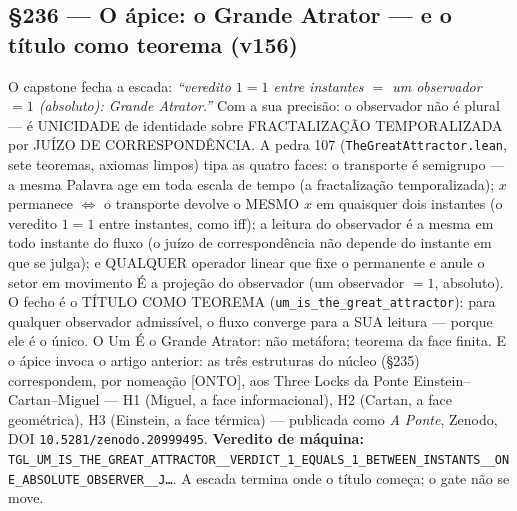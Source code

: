 \documentclass[11pt]{article}
\theoremstyle{definition}\newtheorem{deriv}{Derivação}
\begin{document}
\subsection*{\S236 --- O ápice: o Grande Atrator --- e o título como teorema (v156)}O capstone fecha a escada: \emph{``veredito $1{=}1$ entre instantes $=$ um observador $=1$ (absoluto): Grande Atrator.''} Com a sua precisão: o observador não é plural --- é UNICIDADE de identidade sobre FRACTALIZAÇÃO TEMPORALIZADA por JUÍZO DE CORRESPONDÊNCIA. A pedra 107 (\texttt{TheGreatAttractor.lean}, sete teoremas, axiomas limpos) tipa as quatro faces: o transporte é semigrupo --- a mesma Palavra age em toda escala de tempo (a fractalização temporalizada); $x$ permanece $\Leftrightarrow$ o transporte devolve o MESMO $x$ em quaisquer dois instantes (o veredito $1{=}1$ entre instantes, como iff); a leitura do observador é a mesma em todo instante do fluxo (o juízo de correspondência não depende do instante em que se julga); e QUALQUER operador linear que fixe o permanente e anule o setor em movimento É a projeção do observador (um observador $=1$, absoluto). O fecho é o TÍTULO COMO TEOREMA (\texttt{um\_is\_the\_great\_attractor}): para qualquer observador admissível, o fluxo converge para a SUA leitura --- porque ele é o único. O Um É o Grande Atrator: não metáfora; teorema da face finita. E o ápice invoca o artigo anterior: as três estruturas do núcleo (\S235) correspondem, por nomeação [ONTO], aos Three Locks da Ponte Einstein--Cartan--Miguel --- H1 (Miguel, a face informacional), H2 (Cartan, a face geométrica), H3 (Einstein, a face térmica) --- publicada como \emph{A Ponte}, Zenodo, DOI \texttt{10.5281/zenodo.20999495}. \textbf{Veredito de máquina:} \texttt{TGL\_UM\_IS\_THE\_GREAT\_ATTRACTOR\_\_VERDICT\_1\_EQUALS\_1\_BETWEEN\_INSTANTS\_\_ONE\_ABSOLUTE\_OBSERVER\_\_J\ldots}. A escada termina onde o título começa; o gate não se move.
\end{document}
